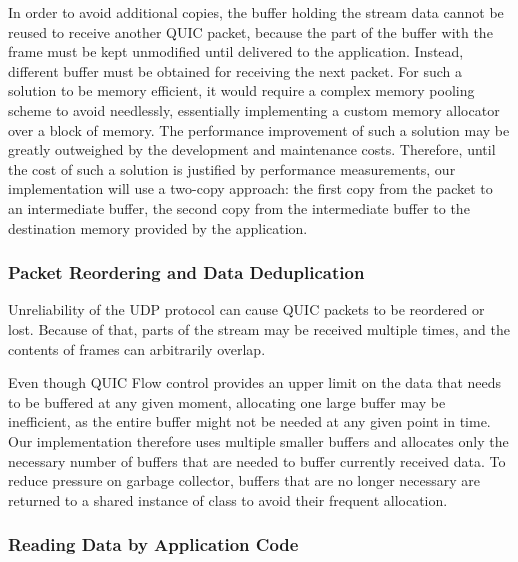 In order to avoid additional copies, the buffer holding the stream data cannot be reused to receive
another QUIC packet, because the part of the buffer with the \STREAM{} frame must be kept unmodified
until delivered to the application. Instead, different buffer must be obtained for receiving the
next packet. For such a solution to be memory efficient, it would require a complex memory pooling
scheme to avoid needlessly, essentially implementing a custom memory allocator over a block of
memory. The performance improvement of such a solution may be greatly outweighed by the development
and maintenance costs. Therefore, until the cost of such a solution is justified by performance
measurements, our implementation will use a two-copy approach: the first copy from the packet to an
intermediate buffer, the second copy from the intermediate buffer to the destination memory provided
by the application.




\subsubsection{Packet Reordering and Data Deduplication}

Unreliability of the UDP protocol can cause QUIC packets to be reordered or lost. Because of that,
parts of the stream may be received multiple times, and the contents of \STREAM{} frames can
arbitrarily overlap.

Even though QUIC Flow control provides an upper limit on the data that needs to be buffered at any
given moment, allocating one large buffer may be inefficient, as the entire buffer might not be
needed at any given point in time. Our implementation therefore uses multiple smaller buffers and
allocates only the necessary number of buffers that are needed to buffer currently received data. To
reduce pressure on garbage collector, buffers that are no longer necessary are returned to a shared
instance of  class to avoid their frequent allocation.

\subsubsection{Reading Data by Application Code}

